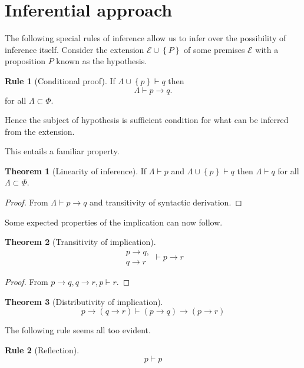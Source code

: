 \documentclass{amsbook}
\newcommand{\setsm}[1]{\left\{#1\right\}}
\newcommand{\infers}{\mathrel\vdash}
\newcommand{\then}{\mathrel\rightarrow}
\theoremstyle{definition}
\newtheorem{frule}{Rule}[section]
\newtheorem{thm}{Theorem}[section]
\begin{document}
\section{Inferential approach}

The following special rules of inference allow us to infer over the possibility of inference itself. Consider the extension $\mathcal E \cup\setsm P$ of some premises $\mathcal E$ with a proposition $P$ known as the hypothesis.

\begin{frule}[Conditional proof]
    If $\Lambda \cup\setsm p \infers q$ then
    $$\Lambda \infers p \then q.$$
    for all $\Lambda \subset \Phi$.
\end{frule}

Hence the subject of hypothesis is sufficient condition for what can be inferred from the extension.

This entails a familiar property.

\begin{thm}[Linearity of inference]
    If $\Lambda \infers p$ and $\Lambda \cup \setsm p \infers q$ then $\Lambda \infers q$ for all $\Lambda \subset \Phi$.
    \begin{proof}
        From $\Lambda \infers p \then q$ and transitivity of syntactic derivation.
    \end{proof}
\end{thm}

Some expected properties of the implication can now follow.

\begin{thm}[Transitivity of implication]
    $$\begin{aligned}
            p \then q, \\
            q \then r
        \end{aligned} \infers p \then r$$
    \begin{proof}
        From $p \then q, q \then r, p \infers r$.
    \end{proof}
\end{thm}

\begin{thm}[Distributivity of implication]
    $$p \then (q \then r) \infers (p \then q) \then (p \then r)$$
\end{thm}

The following rule seems all too evident.

\begin{frule}[Reflection]
    $$p \infers p$$
\end{frule}
\end{document}

